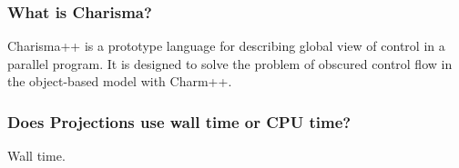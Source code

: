 \subsubsection{What is Charisma?}

Charisma++ is a prototype language for describing global view of control in a parallel program. It is designed to solve the problem of obscured control flow in the object-based model with Charm++.

\subsubsection{Does Projections use wall time or CPU time?}

Wall time.
